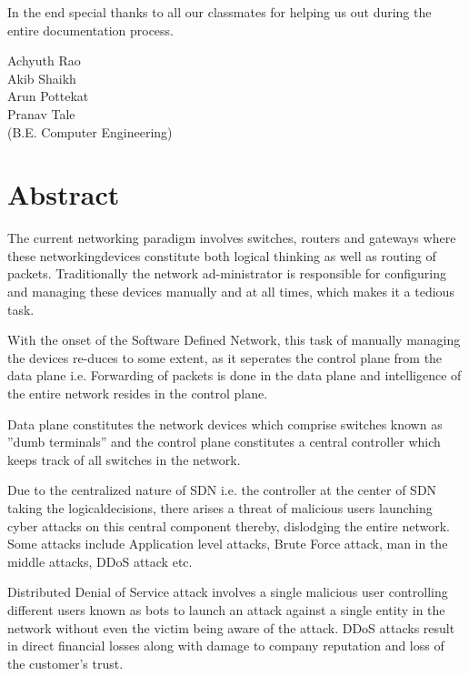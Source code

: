 \documentclass[12pt,a4paper,final]{report}
\begin{document}
In the end special thanks to all our classmates for helping us out during the entire documentation process.

\vspace{3cm}
\begin{flushright}
Achyuth Rao\\
Akib Shaikh\\
Arun Pottekat\\
Pranav Tale\\
(B.E. Computer Engineering)
\end{flushright}
\newpage

\pagestyle{plain} 
\cleardoublepage
{}
\tableofcontents
\newpage

\Large
\chapter*{\centering Abstract}
\normalsize
\noindent
The current networking paradigm involves switches, routers and gateways where these networkingdevices constitute both logical thinking as well as routing of packets. Traditionally the network ad-ministrator is responsible for configuring and managing these devices manually and at all times, which makes it a tedious task.

With the onset of the Software Defined Network, this task of manually managing the devices re-duces to some extent, as it seperates the control plane from the data plane i.e. Forwarding of packets is done in the data plane and intelligence of the entire network resides in the control plane.

Data plane constitutes the network devices which comprise switches known as ”dumb terminals” and the control plane constitutes a central controller which keeps track of all switches in the network.

Due to the centralized nature of SDN i.e. the controller at the center of SDN taking the logicaldecisions, there arises a threat of malicious users launching cyber attacks on this central component thereby, dislodging the entire network. Some attacks include Application level attacks, Brute Force attack, man in the middle attacks, DDoS attack etc.

Distributed Denial of Service attack involves a single malicious user controlling different users known as bots to launch an attack against a single entity in the network without even the victim being aware of the attack. DDoS attacks result in direct financial losses along with damage to company reputation and loss of the customer’s trust.
\end{document}
